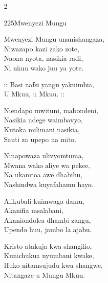 \documentclass{article}
\begin{document}
\begin{multicols}{2}
\begin{hymn}{225}{Mwenyezi Mungu}{}
\begin{stanza}
Mwenyezi Mungu unanishangaza,\\
Niwazapo kazi zako zote,\\
Naona nyota, nasikia radi,\\
Ni ukuu wako juu ya yote.
\end{stanza}
\begin{chorus}
:: Basi nafsi yangu yakuimbia,\\
U Mkuu, u Mkuu. ::
\end{chorus}
\begin{stanza}
Niendapo mwituni, mabondeni,\\
Nasikia ndege waimbavyo,\\
Kutoka milimani nasikia,\\
Sauti za upepo na mito.
\end{stanza}
\begin{stanza}
Ninapowaza ulivyomtuma,\\
Mwana wako aliye wa pekee,\\
Na ukamtoa awe dhabihu,\\
Nashindwa kuyafahamu hayo.
\end{stanza}
\begin{stanza}
Alikubali kuimwaga damu,\\
Akanifia msalabani,\\
Akaniondolea dhambi zangu,\\
Upendo huu, jambo la ajabu.
\end{stanza}
\begin{stanza}
Kristo atakuja kwa shangilio,\\
Kunichukua nyumbani kwake,\\
Huko nitamsujudu kwa shangwe,\\
Nitangaze u Mungu Mkuu.
\end{stanza}
\end{hymn}


\end{multicols}
\end{document}
